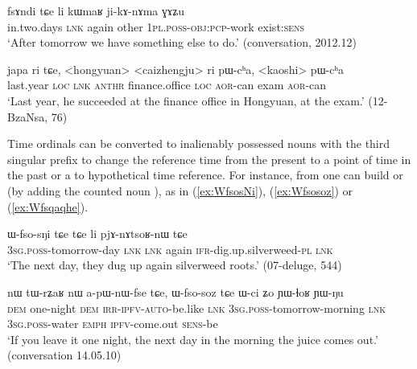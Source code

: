 \begin{exe}
\ex \label{ex:fsAndi}
\gll fsɤndi tɕe li kɯmaʁ ji-kɤ-nɤma ɣɤʑu \\
 in.two.days \textsc{lnk} again other \textsc{1pl}.\textsc{poss}-\textsc{obj}:\textsc{pcp}-work exist:\textsc{sens} \\
\glt `After tomorrow we have something else to do.' (conversation, 2012.12)
\end{exe}
 
\begin{exe}
\ex \label{ex:japa.ri}
\gll  japa ri tɕe, <hongyuan> <caizhengju> ri pɯ-cʰa, <kaoshi> pɯ-cʰa  \\
 last.year \textsc{loc} \textsc{lnk}  \textsc{anthr} finance.office \textsc{loc} \textsc{aor}-can exam \textsc{aor}-can \\
\glt `Last year, he succeeded at the finance office in Hongyuan, at the exam.' (12-BzaNsa, 76)
\end{exe}
 
  
Time ordinals can be converted to inalienably possessed nouns with the third singular prefix  to change the reference time from the present to a point of time in the past or a to hypothetical time reference. For instance,  from  one can build  or  (by adding the counted noun ), as in (\ref{ex:WfsosNi}), (\ref{ex:Wfsosoz}) or (\ref{ex:Wfsqaqhe}).

\begin{exe}
\ex \label{ex:WfsosNi}
\gll  ɯ-fso-sŋi tɕe tɕe li pjɤ-nɤtsoʁ-nɯ tɕe \\ 
 \textsc{3sg}.\textsc{poss}-tomorrow-day \textsc{lnk} \textsc{lnk} again \textsc{ifr}-dig.up.silverweed-\textsc{pl}  \textsc{lnk}\\
\glt `The next day, they dug up again silverweed roots.' (07-deluge, 544)
\end{exe}
  
\begin{exe}
\ex \label{ex:Wfsosoz}
\gll nɯ tɯ-rʑaʁ nɯ a-pɯ-nɯ-fse tɕe, ɯ-fso-soz tɕe ɯ-ci ʑo ɲɯ-ɬoʁ ɲɯ-ŋu  \\
 \textsc{dem} one-night \textsc{dem} \textsc{irr}-\textsc{ipfv}-\textsc{auto}-be.like \textsc{lnk} \textsc{3sg}.\textsc{poss}-tomorrow-morning \textsc{lnk} \textsc{3sg}.\textsc{poss}-water \textsc{emph} \textsc{ipfv}-come.out \textsc{sens}-be \\
\glt `If you leave it one night, the next day in the morning the juice comes out.' (conversation 14.05.10)
\end{exe}
   
